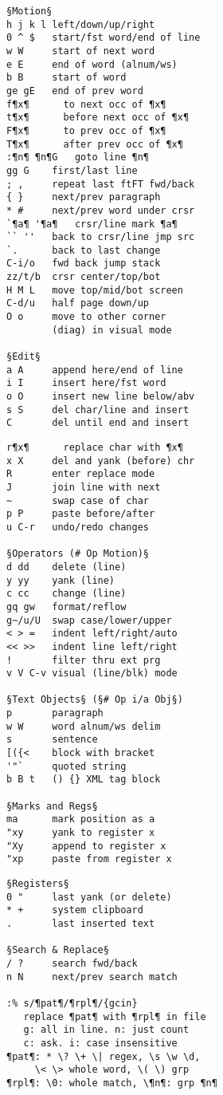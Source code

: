 \documentclass{article}
\begin{document}
\setlength{\columnsep}{7mm}
\begin{multicols}{4}
\begin{lstlisting}
§Motion§
h j k l left/down/up/right
0 ^ $   start/fst word/end of line
w W     start of next word
e E     end of word (alnum/ws)
b B     start of word
ge gE   end of prev word
f¶x¶      to next occ of ¶x¶
t¶x¶      before next occ of ¶x¶
F¶x¶      to prev occ of ¶x¶
T¶x¶      after prev occ of ¶x¶
:¶n¶ ¶n¶G   goto line ¶n¶
gg G    first/last line
; ,     repeat last ftFT fwd/back
{ }     next/prev paragraph
* #     next/prev word under crsr
`¶a¶ '¶a¶   crsr/line mark ¶a¶
`` ''   back to crsr/line jmp src
`.      back to last change
C-i/o   fwd back jump stack
zz/t/b  crsr center/top/bot
H M L   move top/mid/bot screen
C-d/u   half page down/up
O o     move to other corner
        (diag) in visual mode

§Edit§
a A     append here/end of line
i I     insert here/fst word
o O     insert new line below/abv
s S     del char/line and insert
C       del until end and insert
\end{lstlisting}
\begin{lstlisting}
r¶x¶      replace char with ¶x¶
x X     del and yank (before) chr
R       enter replace mode
J       join line with next
~       swap case of char
p P     paste before/after
u C-r   undo/redo changes

§Operators (# Op Motion)§
d dd    delete (line)
y yy    yank (line)
c cc    change (line)
gq gw   format/reflow
g~/u/U  swap case/lower/upper
< > =   indent left/right/auto
<< >>   indent line left/right
!       filter thru ext prg
v V C-v visual (line/blk) mode

§Text Objects§ (§# Op i/a Obj§)
p       paragraph
w W     word alnum/ws delim
s       sentence
[({<    block with bracket
'"`     quoted string
b B t   () {} XML tag block

§Marks and Regs§
ma      mark position as a
"xy     yank to register x
"Xy     append to register x
"xp     paste from register x
\end{lstlisting}
\begin{lstlisting}
§Registers§
0 "     last yank (or delete)
* +     system clipboard
.       last inserted text

§Search & Replace§
/ ?     search fwd/back
n N     next/prev search match

:% s/¶pat¶/¶rpl¶/{gcin}
   replace ¶pat¶ with ¶rpl¶ in file
   g: all in line. n: just count
   c: ask. i: case insensitive
¶pat¶: * \? \+ \| regex, \s \w \d,
     \< \> whole word, \( \) grp
¶rpl¶: \0: whole match, \¶n¶: grp ¶n¶


\end{lstlisting}
\end{multicols}
\end{document}
